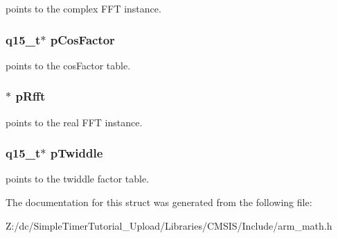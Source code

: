 points to the complex F\-F\-T instance. \hypertarget{structarm__dct4__instance__q15_a9d858d313cbba67ceaef9704bc9c43b0}{
\subsubsection[{p\-Cos\-Factor}]{\setlength{\rightskip}{0pt plus 5cm}q15\-\_\-t$\ast$ p\-Cos\-Factor}}\label{structarm__dct4__instance__q15_a9d858d313cbba67ceaef9704bc9c43b0}
points to the cos\-Factor table. \hypertarget{structarm__dct4__instance__q15_aea6aa42c838f2b22c8c31e9e259b8d75}{
\subsubsection[{p\-Rfft}]{$\ast$ p\-Rfft}}\label{structarm__dct4__instance__q15_aea6aa42c838f2b22c8c31e9e259b8d75}
points to the real F\-F\-T instance. \hypertarget{structarm__dct4__instance__q15_aa8c837c05b2c910342ab8f171d30dc02}{
\subsubsection[{p\-Twiddle}]{\setlength{\rightskip}{0pt plus 5cm}q15\-\_\-t$\ast$ p\-Twiddle}}\label{structarm__dct4__instance__q15_aa8c837c05b2c910342ab8f171d30dc02}
points to the twiddle factor table. 

The documentation for this struct was generated from the following file\-:\begin{DoxyCompactItemize}
\item 
Z\-:/dc/\-Simple\-Timer\-Tutorial\-\_\-\-Upload/\-Libraries/\-C\-M\-S\-I\-S/\-Include/arm\-\_\-math.\-h\end{DoxyCompactItemize}
